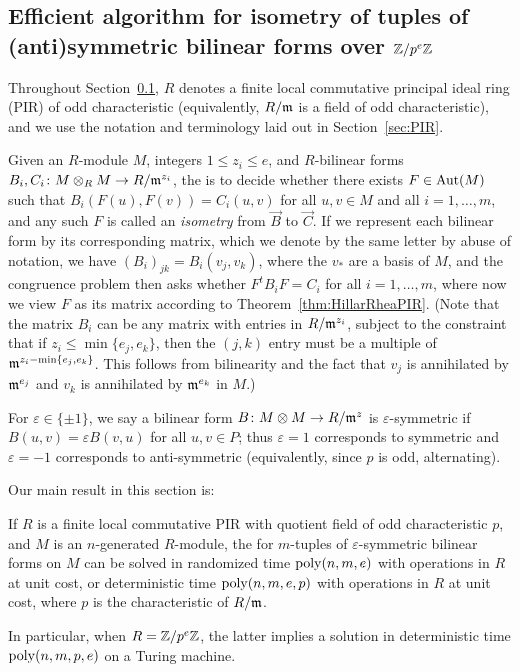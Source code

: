 
\subsection{Efficient algorithm for isometry of tuples of (anti)symmetric bilinear forms over $\mathbb{Z}/p^e \mathbb{Z}$ 
}\label{subsec:tuple-isometry}\label{sec:matrix_tuple}

Throughout Section~\ref{subsec:tuple-isometry}, $R$ denotes a finite local commutative principal ideal ring (PIR) of odd characteristic (equivalently, $R/\mathfrak{m}$ is a field of odd characteristic), and we use the notation and terminology laid out in Section~\ref{sec:PIR}.

Given an $R$-module $M$, integers $1 \leq z_i \leq e$, and $R$-bilinear forms $B_i,C_i \colon M \otimes_R M \to R/\mathfrak{m}^{z_i}$, the  is to decide whether there exists $F \in \mathrm{Aut}(M)$ such that $B_i(F(u), F(v)) = C_i(u,v)$ for all $u,v \in M$ and all $i=1,\dotsc,m$, and any such $F$ is called an \emph{isometry} from $\vec{B}$ to $\vec{C}$. If we represent each bilinear form by its corresponding matrix, which we denote by the same letter by abuse of notation, we have $(B_i)_{jk} = B_i(v_j, v_k)$, where the $v_*$ are a basis of $M$, and the congruence problem then asks whether $F^t B_i F = C_i$ for all $i = 1,\dotsc,m$, where now we view $F$ as its matrix according to Theorem~\ref{thm:HillarRheaPIR}. (Note that the matrix $B_i$ can be any matrix with entries in $R/\mathfrak{m}^{z_i}$, subject to the constraint that if $z_i \leq \min\{e_j, e_k\}$, then the $(j,k)$ entry must be a multiple of $\mathfrak{m}^{z_i - \min\{e_j, e_k\}}$. This follows from bilinearity and the fact that $v_j$ is annihilated by $\mathfrak{m}^{e_j}$ and $v_k$ is annihilated by $\mathfrak{m}^{e_k}$ in $M$.)

For $\varepsilon \in \{\pm 1\}$, we say a bilinear form $B \colon M \otimes M \to R/\mathfrak{m}^z$ is $\varepsilon$-symmetric if $B(u,v) = \varepsilon B(v,u)$ for all $u, v \in P$; thus $\varepsilon=1$ corresponds to symmetric and $\varepsilon=-1$ corresponds to anti-symmetric (equivalently, since $p$ is odd, alternating). 

Our main result in this section is:

\begin{theorem}\label{thm:matrix_tuple_isometry}
If $R$ is a finite local commutative PIR with quotient field of odd characteristic $p$, and $M$ is an $n$-generated $R$-module, the  for $m$-tuples of $\varepsilon$-symmetric bilinear forms on $M$ can be solved in randomized  time $\mathrm{poly}(n,m,e)$ with operations in $R$ at unit cost, or deterministic time $\mathrm{poly}(n,m,e, p)$ with operations in $R$ at unit cost, where $p$ is the characteristic of $R/\mathfrak{m}$.

In particular, when $R = \mathbb{Z}/p^e \mathbb{Z}$, the latter implies a solution in deterministic time $\mathrm{poly}(n,m,p,e)$ on a Turing machine.
\end{theorem}

